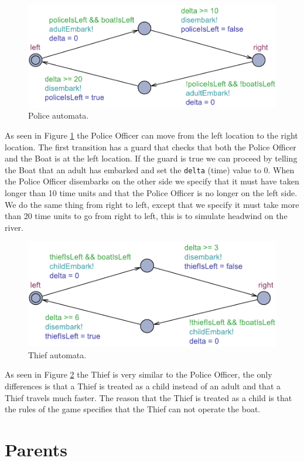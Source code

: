 \documentclass[a4paper,12pt]{scrartcl}
\newcommand{\code}[1]{\colorbox{listinggray}{\texttt{#1}}}
\begin{document}
\begin{figure}[h!]
\centering
\includegraphics[width=0.7\linewidth]{Police.pdf}
\caption{Police automata.}
\label{fig:police}
\end{figure}

As seen in Figure \ref{fig:police} the Police Officer can move from the left location to the right location. The first transition has a guard that checks that both the Police Officer and the Boat is at the left location. If the guard is true we can proceed by telling the Boat that an adult has embarked and set the \code{delta} (time) value to 0. When the Police Officer disembarks on the other side we specify that it must have taken longer than 10 time units and that the Police Officer is no longer on the left side.
We do the same thing from right to left, except that we specify it must take more than 20 time units to go from right to left, this is to simulate headwind on the river.

\begin{figure}[h!]
\centering
\includegraphics[width=0.7\linewidth]{Thief.pdf}
\caption{Thief automata.}
\label{fig:thief}
\end{figure}

As seen in Figure \ref{fig:thief} the Thief is very similar to the Police Officer, the only differences is that a Thief is treated as a child instead of an adult and that a Thief travels much faster. The reason that the Thief is treated as a child is that the rules of the game specifies that the Thief can not operate the boat.

\section*{Parents}
\end{document}

